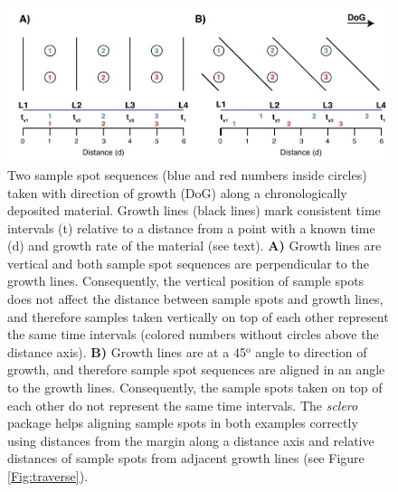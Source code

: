 \documentclass[11pt, a4paper]{article}
\newcommand{\sclero}{\textit{sclero}\xspace}
\begin{document}
\begin{figure}[h]
\begin{center}
\includegraphics[width=1\textwidth]{principle.pdf}
\caption{Two sample spot sequences (blue and red numbers inside circles) taken with direction of growth (DoG) along a chronologically deposited material. Growth lines (black lines) mark consistent time intervals (t) relative to a distance from a point with a known time (d) and growth rate of the material (see text). \textbf{A)} Growth lines are vertical and both sample spot sequences are perpendicular to the growth lines. Consequently, the vertical position of sample spots does not affect the distance between sample spots and growth lines, and therefore samples taken vertically on top of each other represent the same time intervals (colored numbers without circles above the distance axis). \textbf{B)} Growth lines are at a 45$^\mathrm{o}$ angle to direction of growth, and therefore sample spot sequences are aligned in an angle to the growth lines. Consequently, the sample spots taken on top of each other do not represent the same time intervals. The \sclero package helps aligning sample spots in both examples correctly using distances from the margin along a distance axis and relative distances of sample spots from adjacent growth lines (see Figure \ref{Fig:traverse}).}
\label{Fig:principle}
\end{center}
\end{figure}
\end{document}
